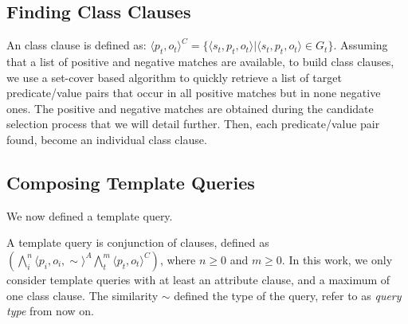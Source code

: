 
\subsection{Finding Class Clauses}
 
An class clause is defined as: $\langle p_t,o_t \rangle^C=\{\langle s_t,p_t,o_t \rangle | \langle s_t,p_t,o_t \rangle \in G_t \}$.  Assuming that a list of positive and negative matches are available, to build class clauses, we use a set-cover based algorithm \cite{DBLP:conf/soda/CarrDKM00} to quickly retrieve a list of target predicate/value pairs that occur in all positive matches but in none negative ones. The positive and negative matches are obtained during the candidate selection process that we will detail further. Then, each predicate/value pair found, become an individual class clause.

\subsection{Composing Template Queries} 

We now defined a template query.

\begin{definition}   A template query is conjunction of clauses, defined as $( \bigwedge_{i}^n\langle p_i,o_i,\sim \rangle^A   \bigwedge_{t}^m\langle p_t,o_t \rangle^C)$, where $n\geq0$ and $m\geq0$. In this work, we only consider template queries with at least an attribute clause, and a maximum of one class clause. The similarity $\sim$ defined the type of the query, refer to as \textit{query type} from now on.
 \end{definition} 
 
